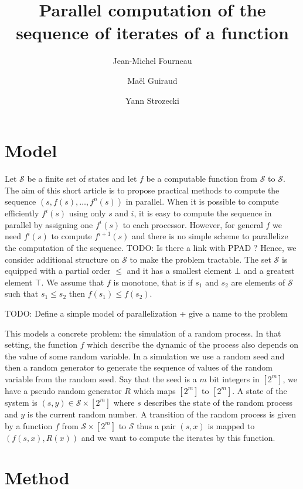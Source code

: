 \documentclass[a4paper,10pt]{article}
\title{Parallel computation of the sequence of iterates of a function }
\author{Jean-Michel Fourneau \and Maël Guiraud \and Yann Strozecki}
\newcommand{\cS}{\mathcal{S}}
\newcommand{\todo}[1]{{\color{red} TODO: {#1}}}
\begin{document}
\maketitle

\begin{abstract}

\end{abstract}

\section{Model}

Let $\cS$ be a finite set of states and let $f$ be a computable function from $\cS$ to $\cS$. 
The aim of this short article is to propose practical methods to compute the sequence $(s,f(s),\dots,f^n(s))$ in parallel.
When it is possible to compute efficiently $f^i(s)$ using only $s$ and $i$, it is easy to compute the sequence
in parallel by assigning one $f^i(s)$ to each processor. However, for general $f$ we need $f^{i}(s)$ to compute $f^{i+1}(s)$ and there is no simple scheme to parallelize the computation of the sequence. \todo{Is there a link with PPAD ?}
Hence, we consider additional structure on $\cS$ to make the problem tractable. The set $\cS$ is equipped with a partial order 
$\leq$ and it has a smallest element $\bot$ and a greatest element $ \top$. We assume that $f$ is monotone, that is 
if $s_1$ and $s_2$ are elements of $\cS$ such that $s_1 \leq s_2$ then $f(s_1) \leq f(s_2)$.


\todo{Define a simple model of parallelization + give a name to the problem}

This models a concrete problem: the simulation of a random process. In that setting, the function $f$ which describe the dynamic of the process also depends on the value of some random variable. In a simulation we use a random seed and then a random generator to generate the sequence of values of the random variable from the random seed. Say that the seed is a $m$ bit integers in $[2^m]$, we have a pseudo random generator $R$ which maps $[2^m]$ to $[2^m]$. A state of the system is $(s,y) \in \cS \times [2^m]$ where $s$ describes the state of the random process and $y$ is the current random number. A transition of the random process is given by a function $f$ from $\cS \times [2^m]$ to $\cS$ thus a pair $(s,x)$ is mapped to $(f(s,x),R(x))$ and we want to compute the iterates by this function.


\section{Method}
\end{document}
